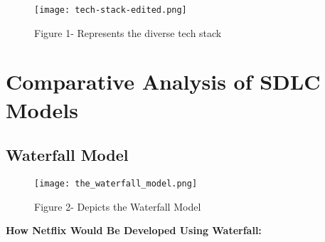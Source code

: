 \documentclass[a4paper,10pt,twoside]{article}
\begin{document}
\begin{figure}[tbhp]
\centering
\texttt{[image: tech-stack-edited.png]}
\caption{Figure 1- Represents the diverse tech stack}
\label{fig:techstack}
\end{figure}

\section{Comparative Analysis of SDLC Models}
\subsection{Waterfall Model}
\begin{figure}[tbhp]
\centering
\texttt{[image: the\_waterfall\_model.png]}
\caption{Figure 2- Depicts the Waterfall Model}
\label{fig:waterfall}
\end{figure}
\textbf{How Netflix Would Be Developed Using Waterfall:}
\end{document}
